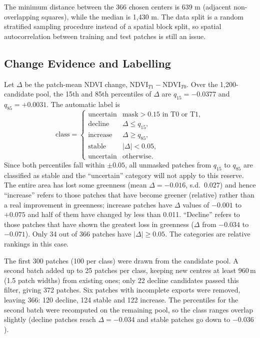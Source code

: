 \documentclass[11pt]{article}
\begin{document}
The minimum distance between the 366 chosen centers is 639 m
(adjacent non-overlapping squares), while the median is 1,430 m.
The data split is a random stratified sampling procedure instead of a
spatial block split, so spatial autocorrelation between training
and test patches is still an issue.

\subsection{Change Evidence and Labelling}

Let $\Delta$ be the patch-mean NDVI change,
$\mathrm{NDVI}_{T1} - \mathrm{NDVI}_{T0}$. Over the 1,200-candidate
pool, the 15th and 85th percentiles of $\Delta$ are $q_{15} = -0.0377$
and $q_{85} = +0.0031$. The automatic label is
\begin{equation}
\mathrm{class} =
\begin{cases}
\text{uncertain} & \text{mask} > 0.15 \text{ in T0 or T1},\\
\text{decline} & \Delta \le q_{15},\\
\text{increase} & \Delta \ge q_{85},\\
\text{stable} & |\Delta| < 0.05,\\
\text{uncertain} & \text{otherwise}.
\end{cases}
\end{equation}
Since both percentiles fall within $\pm 0.05$, all unmasked patches from
$q_{15}$ to $q_{85}$ are classified as stable and the ``uncertain''
category will not apply to this reserve. The entire area has lost some
greenness (mean $\Delta = -0.016$, s.d.\ $0.027$) and hence ``increase''
refers to those patches that have become greener (relative) rather than
a real improvement in greenness; increase patches have $\Delta$ values of
$-0.001$ to $+0.075$ and half of them have changed by less than 0.011.
``Decline'' refers to those patches that have shown the greatest loss in
greenness ($\Delta$ from $-0.034$ to $-0.071$). Only 34 out of 366 patches
have $|\Delta| \ge 0.05$. The categories are relative rankings in this case.

The first 300 patches (100 per class) were drawn from the candidate
pool. A second batch added up to 25 patches per class, keeping new
centres at least 960\,m (1.5 patch widths) from existing ones; only 22
decline candidates passed this filter, giving 372 patches. Six patches
with incomplete exports were removed, leaving 366: 120 decline, 124
stable and 122 increase. The percentiles for the second batch were
recomputed on the remaining pool, so the class ranges overlap slightly
(decline patches reach $\Delta = -0.034$ and stable patches go down to
$-0.036$).
\end{document}
